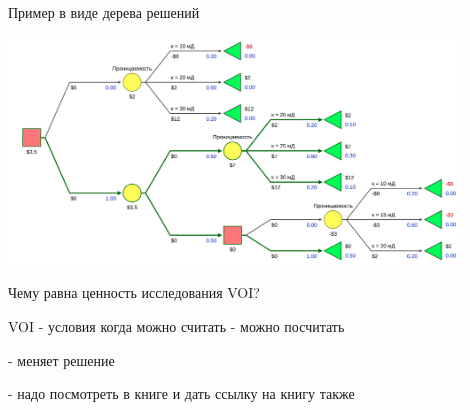 \begin{frame}{Пример в виде дерева решений}
	
	\begin{center}
		\includegraphics[width=0.9\textwidth]{pics/EMV_example_silversecision_2}
	\end{center}
	
	
	Чему равна ценность исследования VOI?  
	
\end{frame}

\begin{frame}{VOI - условия когда можно считать}
	- можно посчитать 
	
	- меняет решение
	
	- надо посмотреть в книге и дать ссылку на книгу также
\end{frame}